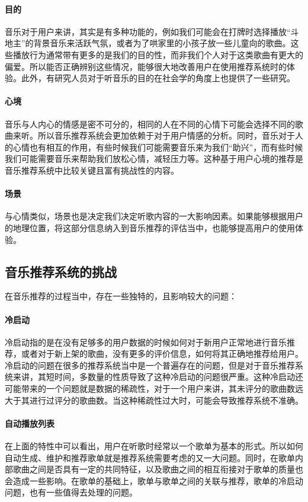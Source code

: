 \paragraph{目的}
音乐对于用户来讲，其实是有多种功能的，例如我们可能会在打牌时选择播放“斗地主”的背景音乐来活跃气氛，或者为了哄家里的小孩子放一些儿童向的歌曲。这些播放行为通常带有更多的是我们的目的性，而非我们个人对于这类歌曲有更大的偏爱。所以能否正确辨别这些情况，能够很大地改善用户在使用推荐系统时的体验。此外，有研究人员对于听音乐的目的在社会学的角度上也提供了一些研究\cite{MusicUses}。

\paragraph{心境}
音乐与人内心的情感是密不可分的，相同的人在不同的心情下可能会选择不同的歌曲来听\cite{EmotionInflunce}。所以音乐推荐系统会更加依赖于对于用户情感的分析。同时，音乐对于人的心情也有相互的作用，有些时候我们可能需要音乐来为我们“助兴”，而有些时候我们可能需要音乐来帮助我们放松心情，减轻压力等。这种基于用户心境的推荐是音乐推荐系统中比较关键且富有挑战性的内容。

\paragraph{场景}
与心情类似，场景也是决定我们决定听歌内容的一大影响因素\cite{SituationalInflunce}。如果能够根据用户的地理位置，将这部分信息纳入到音乐推荐的评估当中，也能够提高用户的使用体验\cite{LocationalInflunce}。

\subsection{音乐推荐系统的挑战}
在音乐推荐的过程当中，存在一些独特的，且影响较大的问题\cite{Challange}：

\paragraph{冷启动}
冷启动指的是在没有足够多的用户数据的时候如何对于新用户正常地进行音乐推荐，或者对于新上架的歌曲，没有更多的评价信息，如何将其正确地推荐给用户。冷启动的问题在很多的推荐系统当中是一个普遍存在的问题\cite{ColdStart}，但是对于音乐推荐系统来讲，其短时间，多数量的性质导致了这种冷启动的问题很严重。这种冷启动还可能带来的一个问题就是数据的稀疏性，对于一个用户来讲，其未评分的歌曲数远大于其进行过评分的歌曲数。当这种稀疏性过大时，可能会导致推荐系统不准确\cite{Challange}。

\paragraph{自动播放列表}
在上面的特性中可以看出，用户在听歌时经常以一个歌单为基本的形式。所以如何自动生成、维护和推荐歌单就是推荐系统需要考虑的又一大问题。同时，在歌单内部歌曲之间是否具有一定的共同特征，以及歌曲之间的相互衔接对于歌单的质量也会造成一些影响\cite{Context}。在歌单的基础上，歌单与歌单之间的关联与推荐，歌单的冷启动问题，也有一些值得去处理的问题。

